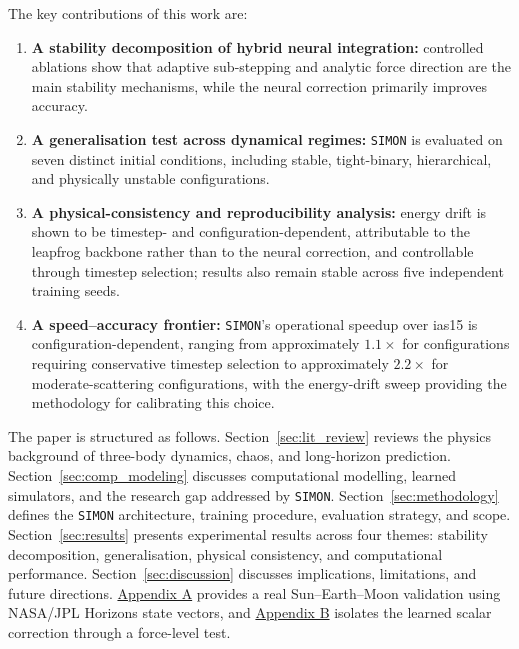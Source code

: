 \documentclass[12pt]{article}
\begin{document}
The key contributions of this work are:
\begin{enumerate}
    \item \textbf{A stability decomposition of hybrid neural integration:} controlled ablations show that adaptive sub-stepping and analytic force direction are the main stability mechanisms, while the neural correction primarily improves accuracy.

    \item \textbf{A generalisation test across dynamical regimes:} \texttt{SIMON} is evaluated on seven distinct initial conditions, including stable, tight-binary, hierarchical, and physically unstable configurations.

    \item \textbf{A physical-consistency and reproducibility analysis:} energy drift is shown
to be timestep- and configuration-dependent, attributable to the leapfrog
backbone rather than to the neural correction, and controllable through timestep
selection; results also remain stable across five independent training seeds.

    \item \textbf{A speed--accuracy frontier:} \texttt{SIMON}'s operational
speedup over ias15 is configuration-dependent, ranging from approximately $1.1\times$
for configurations requiring conservative timestep selection to approximately
$2.2\times$ for moderate-scattering configurations, with the energy-drift
sweep providing the methodology for calibrating this choice.
\end{enumerate}

The paper is structured as follows. Section~\ref{sec:lit_review} reviews the physics background of three-body dynamics, chaos, and long-horizon prediction. Section~\ref{sec:comp_modeling} discusses computational modelling, learned simulators, and the research gap addressed by \texttt{SIMON}. Section~\ref{sec:methodology} defines the \texttt{SIMON} architecture, training procedure, evaluation strategy, and scope. Section~\ref{sec:results} presents experimental results across four themes: stability decomposition, generalisation, physical consistency, and computational performance. Section~\ref{sec:discussion} discusses implications, limitations, and future directions. \hyperref[app:real_system_validation]{Appendix A} provides a real Sun--Earth--Moon validation using NASA/JPL Horizons state vectors,
and \hyperref[app:force_level_nn_validation]{Appendix B} isolates the learned scalar correction through a force-level test.
\end{document}
